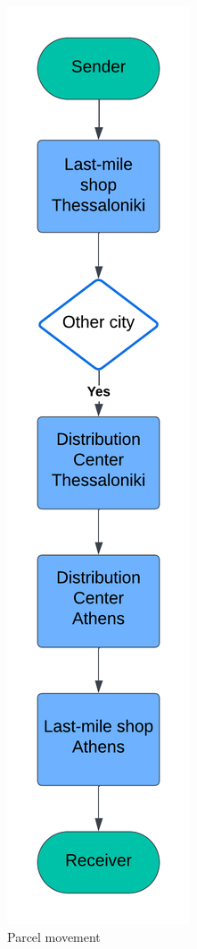 \documentclass[twocolumn]{article}
\begin{document}
	\begin{figure}[t]
		\caption[width=\textwidth]{Parcel movement}
		\includegraphics[width=0.5\columnwidth, height=\textheight]{Use-case-flowchart}
		\centering
	\end{figure}
	
\end{document}
